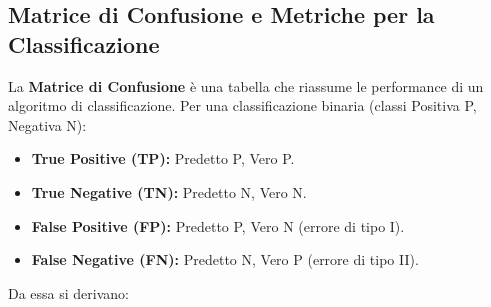 \documentclass[a4paper,11pt]{article}
\begin{document}
\subsection{Matrice di Confusione e Metriche per la Classificazione}
La \textbf{Matrice di Confusione} è una tabella che riassume le performance di un algoritmo di classificazione. Per una classificazione binaria (classi Positiva P, Negativa N):
\begin{itemize}
    \item \textbf{True Positive (TP):} Predetto P, Vero P.
    \item \textbf{True Negative (TN):} Predetto N, Vero N.
    \item \textbf{False Positive (FP):} Predetto P, Vero N (errore di tipo I).
    \item \textbf{False Negative (FN):} Predetto N, Vero P (errore di tipo II).
\end{itemize}
Da essa si derivano:
\end{document}
